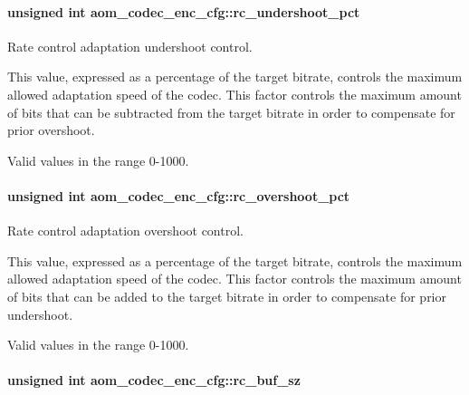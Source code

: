 \paragraph[{\texorpdfstring{rc\+\_\+undershoot\+\_\+pct}{rc_undershoot_pct}}]{\setlength{\rightskip}{0pt plus 5cm}unsigned int aom\+\_\+codec\+\_\+enc\+\_\+cfg\+::rc\+\_\+undershoot\+\_\+pct}\hypertarget{structaom__codec__enc__cfg_a8695946812f24f3719aed80cff00aa29}{}\label{structaom__codec__enc__cfg_a8695946812f24f3719aed80cff00aa29}


Rate control adaptation undershoot control. 

This value, expressed as a percentage of the target bitrate, controls the maximum allowed adaptation speed of the codec. This factor controls the maximum amount of bits that can be subtracted from the target bitrate in order to compensate for prior overshoot.

Valid values in the range 0-\/1000. 
\paragraph[{\texorpdfstring{rc\+\_\+overshoot\+\_\+pct}{rc_overshoot_pct}}]{\setlength{\rightskip}{0pt plus 5cm}unsigned int aom\+\_\+codec\+\_\+enc\+\_\+cfg\+::rc\+\_\+overshoot\+\_\+pct}\hypertarget{structaom__codec__enc__cfg_ad57c8287bcacf2ca7230a3e11906b65c}{}\label{structaom__codec__enc__cfg_ad57c8287bcacf2ca7230a3e11906b65c}


Rate control adaptation overshoot control. 

This value, expressed as a percentage of the target bitrate, controls the maximum allowed adaptation speed of the codec. This factor controls the maximum amount of bits that can be added to the target bitrate in order to compensate for prior undershoot.

Valid values in the range 0-\/1000. 
\paragraph[{\texorpdfstring{rc\+\_\+buf\+\_\+sz}{rc_buf_sz}}]{\setlength{\rightskip}{0pt plus 5cm}unsigned int aom\+\_\+codec\+\_\+enc\+\_\+cfg\+::rc\+\_\+buf\+\_\+sz}\hypertarget{structaom__codec__enc__cfg_a2eb74c50bbc22536248925cd92b746c2}{}\label{structaom__codec__enc__cfg_a2eb74c50bbc22536248925cd92b746c2}


